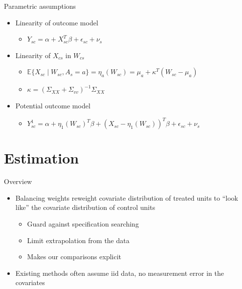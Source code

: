 \documentclass[hyperref={pdfpagelabels=false}]{beamer}
\begin{document}
\begin{frame}{Parametric assumptions}
    \begin{itemize}
        \item Linearity of outcome model \bigskip
        \begin{itemize}
            \item $Y_{sc} = \alpha + X_{sc}^T\beta + \epsilon_{sc} + \nu_s$ \bigskip
        \end{itemize}
        \item Linearity of $X_{cs}$ in $W_{cs}$ \bigskip 
        \begin{itemize}
            \item $\mathbb{E}\{X_{sc} \mid W_{sc}, A_s = a\} = \eta_a(W_{sc}) = \mu_a + \kappa^T(W_{sc} - \mu_a)$ \bigskip
            \item $\kappa = (\Sigma_{XX} + \Sigma_{vv})^{-1}\Sigma_{XX}$ \bigskip
        \end{itemize}
        \item Potential outcome model \bigskip
        \begin{itemize}
            \item $Y_{sc}^1 = \alpha + \eta_1(W_{sc})^T\beta + (X_{sc} - \eta_1(W_{sc}))^T\beta + \epsilon_{sc} + \nu_{s}$
        \end{itemize}
    \end{itemize}
\end{frame}

\section{Estimation}

\begin{frame}{Overview}
    \begin{itemize}
        \item Balancing weights reweight covariate distribution of treated units to ``look like'' the covariate distribution of control units \bigskip
        \begin{itemize}
            \item Guard against specification searching \bigskip
            \item Limit extrapolation from the data \bigskip
            \item Makes our comparisons explicit \bigskip
        \end{itemize}
        \item Existing methods often assume iid data, no measurement error in the covariates
    \end{itemize}
\end{frame}
\end{document}
